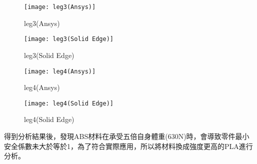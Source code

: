 \begin{figure}[htbp]
  \centering
  \begin{minipage}{0.45\textwidth}
    \centering
    \texttt{[image: leg3(Ansys)]}
    \caption{leg3(Ansys)}
    \label{leg3(Ansys)}
  \end{minipage}
  \hfill
  \begin{minipage}{0.45\textwidth}
    \centering
    \texttt{[image: leg3(Solid Edge)]}
    \caption{leg3(Solid Edge)}
    \label{leg3(Solid Edge)}
  \end{minipage}
  
  \vspace{0.75cm} %
  
  \begin{minipage}{0.45\textwidth}
    \centering
    \texttt{[image: leg4(Ansys)]}
    \caption{leg4(Ansys)}
    \label{leg4(Ansys)}
  \end{minipage}
  \hfill
  \begin{minipage}{0.45\textwidth}
    \centering
    \texttt{[image: leg4(Solid Edge)]}
    \caption{leg4(Solid Edge)}
    \label{leg4(Solid Edge)}
  \end{minipage}  
\end{figure}

\begin{table}[htb!]
  \center\large
  \caption{\Large ABS最大等效應力(MPa)}
\end{table}   

得到分析結果後，發現ABS材料在承受五倍自身體重(630N)時，會導致零件最小安全係數未大於等於1，為了符合實際應用，所以將材料換成強度更高的PLA進行分析。\\


\begin{table}[htb!]
  \center\large
  \caption{\Large PLA最大等效應力(MPa)}
\end{table}

